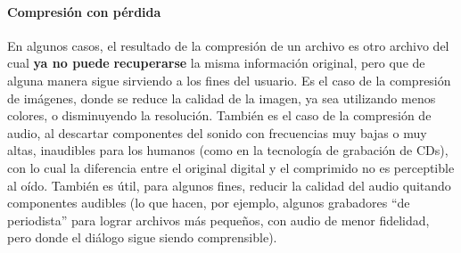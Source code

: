 \documentclass[a4paper]{article}
\begin{document}
\paragraph{Compresi\'on con p\'erdida}
En algunos casos, el resultado de la compresi\'on de un archivo es otro
archivo del cual \textbf{ya no puede} \textbf{recuperarse} la misma
informaci\'on original, pero que de alguna manera sigue sirviendo a los
fines del usuario. Es el caso de la compresi\'on de im\'agenes, donde
se reduce la calidad de la imagen, ya sea utilizando menos colores, o
disminuyendo la resoluci\'on. Tambi\'en es el caso de la compresi\'on
de audio, al descartar componentes del sonido con frecuencias muy bajas
o muy altas, inaudibles para los humanos (como en la tecnolog\'ia de
grabaci\'on de CDs), con lo cual la diferencia entre el original
digital y el comprimido no es perceptible al o\'ido. Tambi\'en es
\'util, para algunos fines, reducir la calidad del audio quitando
componentes audibles (lo que hacen, por ejemplo, algunos grabadores
{\textquotedblleft}de periodista{\textquotedblright} para lograr
archivos m\'as peque\~nos, con audio de menor fidelidad, pero donde el
di\'alogo sigue siendo comprensible).
\end{document}
